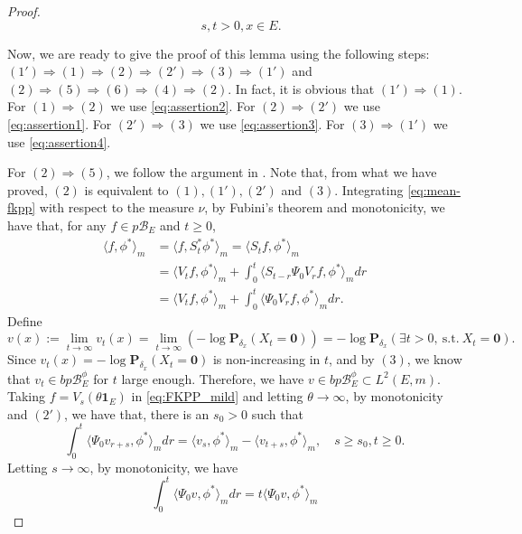 \documentclass[UTF8]{pkuthss}
\theoremstyle{plain}
\theoremstyle{definition}
\numberwithin{equation}{section}
\begin{document}
\begin{proof}
\begin{equation}
	\quad s,t>0,x\in E.
\end{equation}
\par
	Now, we are ready to give the proof of this lemma using the following steps: 
	$(1')\Rightarrow (1)\Rightarrow (2)\Rightarrow (2')\Rightarrow (3)\Rightarrow (1')$
	and $(2)\Rightarrow (5)\Rightarrow (6)\Rightarrow (4)\Rightarrow (2)$.
	In fact, it is obvious that 
	$(1')\Rightarrow (1)$.
	For $(1)\Rightarrow (2)$ we use \eqref{eq:assertion2}.
	For $(2)\Rightarrow (2')$ we use \eqref{eq:assertion1}.
	For $(2')\Rightarrow (3)$ we use \eqref{eq:assertion3}.
	For $(3)\Rightarrow (1')$ we use \eqref{eq:assertion4}.
\par
	For $(2)\Rightarrow (5)$, we follow the argument in \cite[Lemma 3.3]{RenSongZhang2015Limit}.
	Note that, from what we have proved, $(2)$ is equivalent to 
	$(1),(1'),(2')$ and $(3)$.
Integrating \eqref{eq:mean-fkpp} with respect to the measure $\nu$,
	by Fubini's theorem and monotonicity, we have that, for any $f\in p\mathscr B_E$ and $t\geq 0$,
\begin{equation}\label{eq:FKPP_mild}\begin{split}
	\langle f,\phi^*\rangle_m
	&=\langle f,S_t^*\phi^*\rangle_m
	=\langle S_tf,\phi^*\rangle_m\\
	&=\langle V_tf,\phi^*\rangle_m + \int_0^t\langle S_{t-r}\Psi_0V_rf,\phi^*\rangle_m dr\\
	&=\langle V_tf,\phi^*\rangle_m + \int_0^t \langle \Psi_0V_rf,\phi^*\rangle_mdr.
\end{split}\end{equation}
	Define
\[
 	v(x)
 	:= \lim_{t\to\infty} v_t(x)
 	= \lim_{t\to\infty}(-\log\mathbf P_{\delta_x}(X_t=\mathbf 0))
 	= -\log \mathbf P_{\delta_x}(\exists t>0, ~\text{s.t.}~ X_t=\mathbf 0).
 \]
	Since $v_t(x)=-\log\mathbf P_{\delta_x}(X_t=\mathbf 0)$ is non-increasing in $t$, and by $(3)$, we know that $v_t\in bp\mathscr B^\phi_E$ for $t$ large enough.
	Therefore, we have $v\in bp\mathscr B^\phi_E\subset L^2(E,m)$.
	Taking $f=V_s(\theta \mathbf 1_E)$ in \eqref{eq:FKPP_mild} and letting $\theta\to\infty$, by monotonicity and $(2')$, we have that, there is an $s_0>0$ such that
\begin{equation}\label{eq:extinction-vt-phi}
	\int_0^t \langle \Psi_0 v_{r+s},\phi^*\rangle_mdr
	=\langle v_s,\phi^*\rangle_m-\langle v_{t+s},\phi^*\rangle_m,
	\quad s\geq s_0, t\geq 0.
\end{equation}
	Letting $s\to\infty$, by monotonicity, we have
\[
	\int_0^t \langle \Psi_0v, \phi^* \rangle_m dr
	= t \langle \Psi_0 v, \phi^* \rangle_m
\]
\end{proof}
\end{document}
